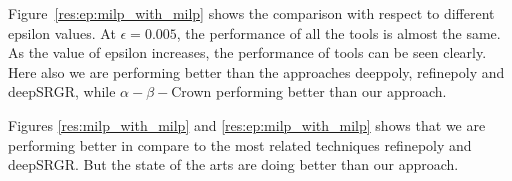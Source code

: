 Figure~\ref{res:ep:milp_with_milp} shows the comparison with respect to different epsilon values. 
At $\epsilon=0.005$, the performance of all the tools is almost the same. As the value of epsilon increases, the 
performance of tools can be seen clearly. Here also we are performing better than the approaches deeppoly, refinepoly and deepSRGR,
while $\alpha - \beta -$Crown performing better than our approach. 

Figures \ref{res:milp_with_milp} and \ref{res:ep:milp_with_milp} shows that we are performing better in compare to
the most related techniques refinepoly and deepSRGR. But the state of the arts are doing better than our approach. 


